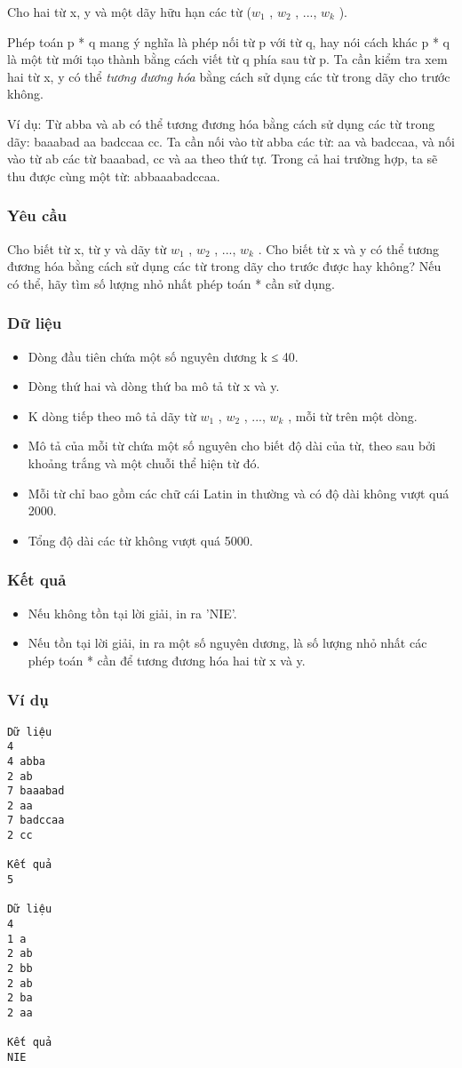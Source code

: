 



   Cho hai từ x, y và một dãy hữu hạn các từ ($w_{1}$   , $w_{2}$   , ..., $w_{k}$   ).  



   Phép toán p * q mang ý nghĩa là phép nối từ p với từ q, hay nói cách khác p * q là một từ mới tạo thành bằng cách viết từ q phía sau từ p.   Ta cần kiểm tra xem hai từ x, y có thể   \textit{    tương đương hóa   }   bằng cách sử dụng các từ trong dãy cho trước không.  

   Ví dụ: Từ abba và ab có thể tương đương hóa bằng cách sử dụng các từ trong dãy: baaabad aa badccaa cc. Ta cần nối vào từ abba các   từ: aa và badccaa, và nối vào từ ab các từ baaabad, cc và aa theo thứ tự. Trong cả hai trường hợp, ta sẽ thu được cùng một từ:   abbaaabadccaa.  

\subsubsection{   Yêu cầu  }

   Cho biết từ x, từ y và dãy từ $w_{1}$   , $w_{2}$   , ..., $w_{k}$   . Cho biết từ x và y có thể tương đương hóa bằng cách   sử dụng các từ trong dãy cho trước được hay không? Nếu có thể, hãy tìm số lượng nhỏ nhất phép toán * cần sử dụng.  

\subsubsection{   Dữ liệu  }
\begin{itemize}
	\item     Dòng đầu tiên chứa một số nguyên dương k ≤ 40.   
	\item     Dòng thứ hai và dòng thứ ba mô tả từ x và y.   
	\item     K dòng tiếp theo mô tả dãy từ $w_{1}$    , $w_{2}$    , ..., $w_{k}$    , mỗi từ trên một dòng.   
	\item     Mô tả của mỗi từ chứa một số nguyên cho biết độ dài của từ, theo sau bởi khoảng trắng và một chuỗi thể hiện từ đó.   
	\item     Mỗi từ chỉ bao gồm các chữ cái Latin in thường và có độ dài không vượt quá 2000.   
	\item     Tổng độ dài các từ không vượt quá 5000.   
\end{itemize}

\subsubsection{   Kết quả  }
\begin{itemize}
	\item     Nếu không tồn tại lời giải, in ra 'NIE'.   
	\item     Nếu tồn tại lời giải, in ra một số nguyên dương, là số lượng nhỏ nhất các phép toán * cần để tương đương hóa hai từ x và y.   
\end{itemize}

\subsubsection{   Ví dụ  }
\begin{verbatim}
Dữ liệu
4
4 abba
2 ab
7 baaabad
2 aa
7 badccaa
2 cc

Kết quả
5

Dữ liệu
4
1 a
2 ab
2 bb
2 ab
2 ba
2 aa

Kết quả
NIE
\end{verbatim}
